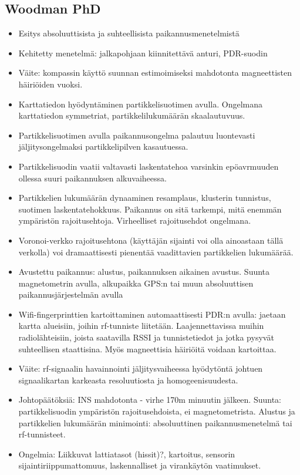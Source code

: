 \documentclass[a4paper]{scrartcl}
\begin{document}
\subsection{Woodman PhD\cite{woodman2010pedestrian}}
\begin{itemize}
  \item Esitys absoluuttisista ja suhteellisista paikannusmenetelmistä
  \item Kehitetty menetelmä: jalkapohjaan kiinnitettävä anturi, PDR-suodin
  \item Väite: kompassin käyttö suunnan estimoimiseksi mahdotonta
    magneettisten häiriöiden vuoksi.
  \item Karttatiedon hyödyntäminen partikkelisuotimen avulla. Ongelmana
    karttatiedon symmetriat, partikkelilukumäärän skaalautuvuus.
  \item Partikkelisuotimen avulla paikannusongelma palautuu luontevasti
    jäljitysongelmaksi partikkelipilven kasautuessa.
  \item Partikkelisuodin vaatii valtavasti laskentatehoa varsinkin epöavrmuuden
    ollessa suuri paikannuksen alkuvaiheessa.
  \item Partikkelien lukumäärän dynaaminen resamplaus, klusterin tunnistus,
    suotimen laskentatehokkuus. Paikannus on sitä tarkempi, mitä enemmän
    ympäristön rajoitusehtoja. Virheelliset rajoitusehdot ongelmana.
  \item Voronoi-verkko rajoitusehtona (käyttäjän sijainti voi olla ainoastaan
    tällä verkolla) voi dramaattisesti pienentää vaadittavien
    partikkelien lukumäärää.
  \item Avustettu paikannus: alustus, paikannuksen aikainen avustus. Suunta
    magnetometrin avulla, alkupaikka GPS:n tai muun absoluuttisen
    paikannusjärjestelmän avulla
  \item Wifi-fingerprinttien kartoittaminen automaattisesti PDR:n avulla:
    jaetaan kartta alueisiin, joihin rf-tunniste liitetään. Laajennettavissa
    muihin radiolähteisiin, joista saatavilla RSSI ja tunnistetiedot ja
    jotka pysyvät suhteellisen staattisina. Myös magneettisia häiriöitä
    voidaan kartoittaa.
  \item Väite: rf-signaalin havainnointi jäljitysvaiheessa hyödytöntä johtuen
    signaalikartan karkeasta resoluutiosta ja homogeenisuudesta.
  \item Johtopäätöksiä: INS mahdotonta - virhe 170m minuutin jälkeen. Suunta:
    partikkelisuodin ympäristön rajoitusehdoista, ei magnetometrista.
    Alustus ja partikkelien lukumäärän minimointi: absoluuttinen
    paikannusmenetelmä tai rf-tunnisteet.
  \item Ongelmia: Liikkuvat lattiatasot (hissit)?, kartoitus, sensorin
    sijaintiriippumattomuus, laskennalliset ja virankäytön vaatimukset.
\end{itemize}
\end{document}
